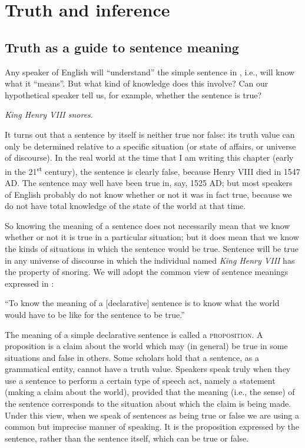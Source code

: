 \chapter{Truth and inference}\label{sec:3}

\section{Truth as a guide to sentence meaning}\label{sec:3.1}

Any speaker of English will “understand” the simple sentence in , i.e., will know what it “means”. But what kind of knowledge does this involve? Can our hypothetical speaker tell us, for example, whether the sentence is true?


\ea \label{ex:3.1}
\textit{King Henry VIII snores}.
\z


It turns out that a sentence by itself is neither true nor false: its truth value can only be determined relative to a specific situation (or state of affairs, or universe of discourse). In the real world at the time that I am writing this chapter (early in the 21\textsuperscript{st} century), the sentence is clearly false, because Henry VIII died in 1547 AD. The sentence may well have been true in, say, 1525 AD; but most speakers of English probably do not know whether or not it was in fact true, because we do not have total knowledge of the state of the world at that time.



So knowing the meaning of a sentence does not necessarily mean that we know whether or not it is true in a particular situation; but it does mean that we know the kinds of situations in which the sentence would be true. Sentence  will be true in any universe of discourse in which the individual named \textit{King Henry VIII} has the property of snoring. We will adopt the common view of sentence meanings expressed in :


\eanoraggedright \label{ex:3.2}
“To know the meaning of a [declarative] sentence is to know what the world would have to be like for the sentence to be true.”\\\hbox{}\hfill\hbox{\citep[4]{DowtyEtAl1981}}
\z


The meaning of a simple declarative sentence is called a \textsc{proposition}. A proposition is a claim about the world which may (in general) be true in some situations and false in others. Some scholars hold that a sentence, as a grammatical entity, cannot have a truth value. Speakers speak truly when they use a sentence to perform a certain type of speech act, namely a statement (making a claim about the world), provided that the meaning (i.e., the sense) of the sentence corresponds to the situation about which the claim is being made. Under this view, when we speak of sentences as being true or false we are using a common but imprecise manner of speaking. It is the proposition expressed by the sentence, rather than the sentence itself, which can be true or false.



